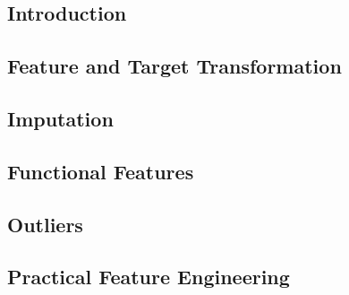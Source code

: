 
\subsection{Introduction}


\subsection{Feature and Target Transformation}


\subsection{Imputation}


\subsection{Functional Features}


\subsection{Outliers}


\subsection{Practical Feature Engineering}

